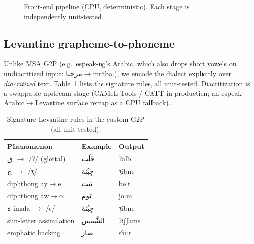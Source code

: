 \documentclass[10pt,twocolumn]{article}
\newcommand{\ar}[1]{\textarabic{#1}}        %
\newcommand{\ipa}[1]{{\ipafont #1}}          %
\begin{document}
\begin{figure}[t]\centering
{}
\caption{Front-end pipeline (CPU, deterministic). Each stage is independently
unit-tested.}
\label{fig:fe}
\end{figure}

\subsection{Levantine grapheme-to-phoneme}
Unlike MSA G2P (e.g.\ espeak-ng's Arabic, which also drops short vowels on
undiacritized input: \ar{مرحبا}$\rightarrow$\ipa{mrħbaː}), we encode the dialect
explicitly over \emph{diacritized} text. Table~\ref{tab:g2p} lists the signature rules,
all unit-tested. Diacritization is a swappable upstream stage (CAMeL Tools / CATT in
production; an espeak-Arabic$\rightarrow$Levantine surface remap as a CPU fallback).

\begin{table}[t]\centering\small
\caption{Signature Levantine rules in the custom G2P (all unit-tested).}
\label{tab:g2p}
\begin{tabular}{@{}lll@{}}
\toprule
Phenomenon & Example & Output \\
\midrule
\ar{ق} $\rightarrow$ \ipa{/ʔ/} (glottal) & \ar{قَلْب} & \ipa{ʔalb}\\
\ar{ج} $\rightarrow$ \ipa{/ʒ/} & \ar{جِبْنة} & \ipa{ʒibne}\\
diphthong \ipa{ay}$\rightarrow$\ipa{eː} & \ar{بَيت} & \ipa{beːt}\\
diphthong \ipa{aw}$\rightarrow$\ipa{oː} & \ar{يَوم} & \ipa{joːm}\\
\ar{ة} imala $\rightarrow$ \ipa{/e/} & \ar{جِبْنة} & \ipa{ʒibne}\\
sun-letter assimilation & \ar{الشَّمس} & \ipa{ʔiʃʃams}\\
emphatic backing & \ar{صار} & \ipa{sˤɑːr}\\
\bottomrule
\end{tabular}
\end{table}
\end{document}
